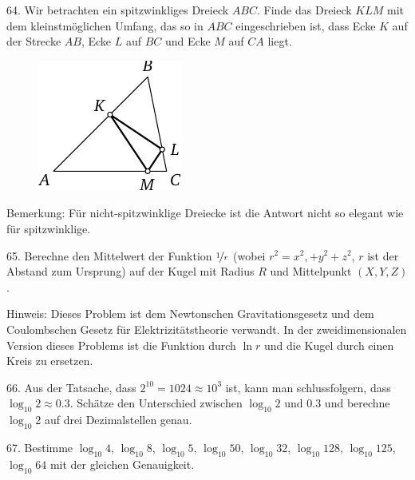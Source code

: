 \begin{problem}{64.}
	Wir betrachten ein spitzwinkliges Dreieck $ABC$. Finde das Dreieck $KLM$ mit dem kleinstmöglichen Umfang, das so in $ABC$ eingeschrieben ist, dass Ecke $K$ auf der Strecke $AB$, Ecke $L$ auf $BC$ und Ecke $M$ auf $CA$ liegt. 
	\begin{figure}
		\includegraphics{taskbook-48} 
	\end{figure}

	\begin{note}{Bemerkung:}
		Für nicht-spitzwinklige Dreiecke ist die Antwort nicht so elegant wie für spitzwinklige.
	\end{note}
\end{problem}

\begin{problem}{65.}
	Berechne den Mittelwert der Funktion $\nicefrac{1}{r}$ (wobei $r^2 =x^2,+y^2+z^2$, $r$ ist der Abstand zum Ursprung)  auf der Kugel mit Radius $R$ und Mittelpunkt $(X,Y,Z)$.

	\begin{note}{Hinweis:}
		Dieses Problem ist dem Newtonschen Gravitationsgesetz und dem Coulombschen Gesetz für Elektrizitätstheorie verwandt. In der zweidimensionalen Version dieses Problems ist die Funktion durch $\ln r$ und die Kugel durch einen Kreis zu ersetzen.
	\end{note}
\end{problem}

\begin{problem}{66.}
	Aus der Tatsache, dass $2^{10}=1024 \approx 10^3$ ist, kann man schlussfolgern, dass $\log_{10} 2 \approx 0.3$. Schätze den Unterschied zwischen $\log_{10} 2$ und $0.3$ und berechne $\log_{10} 2$ auf drei Dezimalstellen genau. 
\end{problem}

\begin{problem}{67.}
	Bestimme $\log_{10} 4$, $\log_{10} 8$, $\log_{10} 5$, $\log_{10} 50$, $\log_{10} 32$, $\log_{10} 128$, $\log_{10} 125$, $\log_{10} 64$ mit der gleichen Genauigkeit.
\end{problem}

